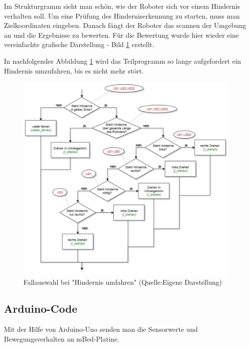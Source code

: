 Im Strukturgramm sieht man schön, wie der Roboter sich vor einem Hindernis verhalten soll. Um eine Prüfung des Hinderniserkennung zu starten, muss man Zielkoordinaten eingeben. Danach fängt der Roboter das scannen der Umgebung an und die Ergebnisse zu bewerten. Für die Bewertung wurde hier wieder eine vereinfachte grafische Darstellung - Bild \ref{baum2} erstellt.

In nachfolgender Abbildung \ref{baum2} wird das Teilprogramm so lange aufgefordert ein Hindernis umzufahren, bis es nicht mehr stört.

\begin{figure}[!h]  %
	\centering\includegraphics[width=0.99\textwidth]{images/Entsch-baum2.jpg}
	\caption{ Fallauswahl bei "Hindernis umfahren" (Quelle:Eigene Darstellung)}
	\label{baum2} %
\end{figure}
\pagebreak

\subsection{Arduino-Code}

Mit der Hilfe von Arduino-Uno senden man die Sensorwerte und Bewegungsverhalten an mBed-Platine. 

